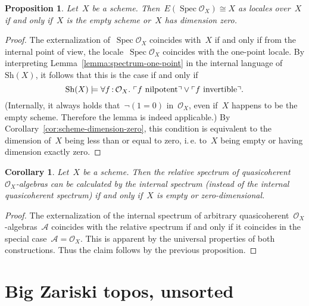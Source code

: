 \documentclass[10pt]{amsart}
\makeatletter
\theoremstyle{definition}
\theoremstyle{plain}
\newtheorem{prop}[defn]{Proposition}
\newtheorem{cor}[defn]{Corollary}
\theoremstyle{remark}
\newcommand{\A}{\mathcal{A}}
\renewcommand{\O}{\mathcal{O}}
\newcommand{\Sh}{\mathrm{Sh}}
\DeclareMathOperator{\Spec}{Spec}
\newcommand{\?}{\,{:}\,}
\renewcommand{\_}{\mathpunct{.}\,}
\newcommand{\speak}[1]{\ulcorner\text{\textnormal{#1}}\urcorner}
\newcommand{\ie}{i.\,e.\@\xspace}
\makeatother
\begin{document}
\begin{prop}Let~$X$ be a scheme. Then~$E(\Spec\O_X) \cong X$ as locales
over~$X$ if and only if~$X$ is the empty scheme or~$X$ has dimension zero.\end{prop}
\begin{proof}The externalization of~$\Spec\O_X$ coincides with~$X$ if and only
if from the internal point of view, the locale~$\Spec\O_X$ coincides with the
one-point locale. By interpreting Lemma~\ref{lemma:spectrum-one-point} in the
internal language of~$\Sh(X)$, it follows that this is the case if and only if
\[ \Sh(X) \models \forall f\?\O_X\_ \speak{$f$ nilpotent} \vee \speak{$f$
invertible}. \]
(Internally, it always holds that~$\neg(1 = 0)$ in~$\O_X$, even if~$X$ happens
to be the empty scheme. Therefore the lemma is indeed applicable.) By
Corollary~\ref{cor:scheme-dimension-zero}, this condition is equivalent to the
dimension of~$X$ being less than or equal to zero, \ie to~$X$ being empty or
having dimension exactly zero.
\end{proof}

\begin{cor}Let~$X$ be a scheme. Then the relative spectrum of
quasicoherent~$\O_X$-algebras can be calculated by
the internal spectrum (instead of the internal quasicoherent spectrum) if and
only if~$X$ is empty or zero-dimensional.\end{cor}
\begin{proof}The externalization of the internal spectrum of arbitrary
quasicoherent~$\O_X$-algebras~$\A$ coincides with the relative spectrum if and
only if it coincides in the special case~$\A = \O_X$. This is apparent by the
universal properties of both constructions. Thus the claim follows by the
previous proposition.
\end{proof}


\section{Big Zariski topos, unsorted}
\end{document}
